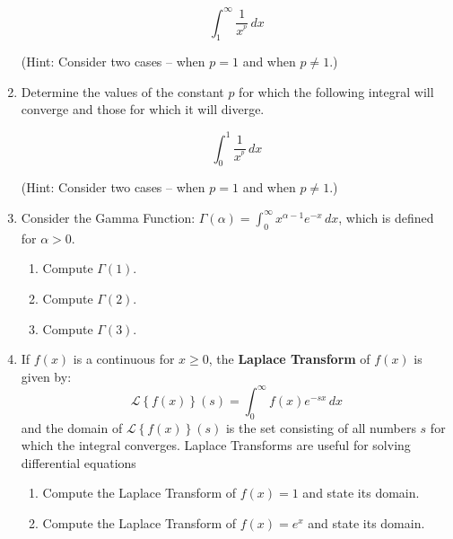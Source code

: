 \documentclass[12pt]{article}
\newif\ifans
\begin{document}
\begin{enumerate}
$$\int_1^\infty \frac{1}{x^{^p}} \,dx$$

(Hint: Consider two cases -- when $p=1$ and when $p \neq 1$.)

\ifans{\fbox{Converges to $\frac{1}{p-1}$ if $p>1$; Diverges if $p \leq 1$}} \fi

\newpage

\item Determine the values of the constant $p$ for which the following integral will converge and those for which it will diverge.  

$$\int_0^1 \frac{1}{x^{^p}} \,dx$$

(Hint: Consider two cases -- when $p=1$ and when $p \neq 1$.)

\ifans{\fbox{Converges to $\frac{1}{1-p}$ if $p<1$; Diverges if $p \geq 1$}} \fi

\item Consider the Gamma Function: $\Gamma(\alpha)=\int_0^{\infty} x^{\alpha-1}e^{-x} \,dx$, which is defined for $\alpha>0$.

\begin{enumerate}

\item Compute $\Gamma(1)$.

\ifans{\fbox{1}} \fi

\item Compute $\Gamma(2)$.

\ifans{\fbox{$1$}} \fi

\item Compute $\Gamma(3)$.

\ifans{\fbox{$2$}} \fi

\end{enumerate}

\item If $f(x)$ is a continuous for $x \geq 0$, the {\bf Laplace Transform} of $f(x)$ is given by: $$\mathcal{L}\left\{f(x)\right\}(s)=\int_0^{\infty} f(x)e^{-sx}\,dx$$
and the domain of $\mathcal{L}\left\{f(x)\right\}(s)$ is the set consisting of all numbers $s$ for which the integral converges.  Laplace Transforms are useful for solving differential equations

\begin{enumerate}

\item Compute the Laplace Transform of $f(x)=1$ and state its domain.

\ifans{\fbox{$\mathcal{L}\left\{1\right\}(s)=\frac{1}{s}$ for $s >0$}} \fi

\item Compute the Laplace Transform of $f(x)=e^x$ and state its domain.


\end{enumerate}
\end{enumerate}
\end{document}
